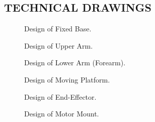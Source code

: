\begin{appendices}
\renewcommand{\appendixname}{APPENDIX}
\section{\centering TECHNICAL DRAWINGS}


\begin{figure}[h]
    \centering
    \caption{Design of Fixed Base.}
    \label{fig:drawing_fixed_base}
\end{figure}

\begin{figure}[h]
    \centering
    \caption{Design of Upper Arm.}
    \label{fig:drawing_upper_arm}
\end{figure}

\begin{figure}[h]
    \centering
    \caption{Design of Lower Arm (Forearm).}
    \label{fig:drawing_lower_arm}
\end{figure}

\begin{figure}[h]
    \centering
    \caption{Design of Moving Platform.}
    \label{fig:drawing_moving_platform}
\end{figure}

\begin{figure}[h]
    \centering
    \caption{Design of End-Effector.}
    \label{fig:drawing_end_effector}
\end{figure}

\begin{figure}[h]
    \centering
    \caption{Design of Motor Mount.}
    \label{fig:drawing_motor_mount}
\end{figure}


\end{appendices}
